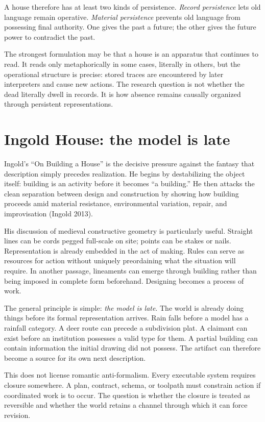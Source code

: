 \documentclass[11pt]{article}
\begin{document}
A house therefore has at least two kinds of persistence. \emph{Record persistence} lets old language remain operative. \emph{Material persistence} prevents old language from possessing final authority. One gives the past a future; the other gives the future power to contradict the past.

The strongest formulation may be that a house is an apparatus that continues to read. It reads only metaphorically in some cases, literally in others, but the operational structure is precise: stored traces are encountered by later interpreters and cause new actions. The research question is not whether the dead literally dwell in records. It is how absence remains causally organized through persistent representations.

\section{Ingold House: the model is late}

Ingold's ``On Building a House'' is the decisive pressure against the fantasy that description simply precedes realization. He begins by destabilizing the object itself: building is an activity before it becomes ``a building.'' He then attacks the clean separation between design and construction by showing how building proceeds amid material resistance, environmental variation, repair, and improvisation (Ingold 2013).

His discussion of medieval constructive geometry is particularly useful. Straight lines can be cords pegged full-scale on site; points can be stakes or nails. Representation is already embedded in the act of making. Rules can serve as resources for action without uniquely preordaining what the situation will require. In another passage, lineaments can emerge through building rather than being imposed in complete form beforehand. Designing becomes a process of work.

The general principle is simple: \emph{the model is late}. The world is already doing things before its formal representation arrives. Rain falls before a model has a rainfall category. A deer route can precede a subdivision plat. A claimant can exist before an institution possesses a valid type for them. A partial building can contain information the initial drawing did not possess. The artifact can therefore become a source for its own next description.

This does not license romantic anti-formalism. Every executable system requires closure somewhere. A plan, contract, schema, or toolpath must constrain action if coordinated work is to occur. The question is whether the closure is treated as reversible and whether the world retains a channel through which it can force revision.
\end{document}
